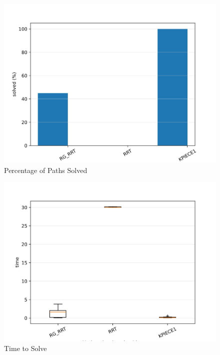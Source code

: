 \documentclass[conference]{IEEEtran}
\begin{document}
\begin{figure}[htp]
\centering
\includegraphics[scale=0.5]{combatBenchmarking/9.jpg}
\caption{Percentage of Paths Solved}
\label{Percentage of Paths Solved}
\end{figure}

\begin{figure}[htp]
\centering
\includegraphics[scale=0.5]{combatBenchmarking/11.jpg}
\caption{Time to Solve}
\label{Time to Solve}
\end{figure}



\newpage
\end{document}

